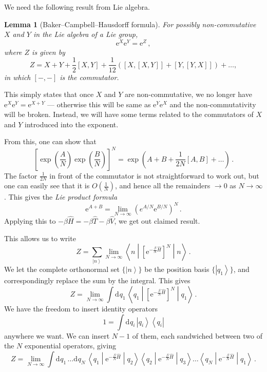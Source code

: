 \documentclass{article}
\theoremstyle{plain}\theoremheaderfont{\normalfont\itshape}\theorembodyfont{\rmfamily}\theoremseparator{.}\newtheorem*{rem}{Remark}\newtheorem*{ex}{Example}\newtheorem*{proof}{Proof}\newtheorem*{altp}{Alternative proof}
\theoremstyle{plain}\theoremheaderfont{\normalfont\bfseries}\theorembodyfont{\rmfamily}\theoremseparator{.}\newtheorem{thm}{Theorem}[section]\newtheorem{lem}[thm]{Lemma}\newtheorem{prop}[thm]{Proposition}\newtheorem*{cor}{Corollary}\newtheorem{defn}[thm]{Definition}\newtheorem{clm}[thm]{Claim}\newtheorem{clminproof}{Claim}
\theoremstyle{break}\theoremheaderfont{\normalfont\itshape}\theorembodyfont{\rmfamily}\theoremseparator{.\medskip}\newtheorem*{proofskip}{Proof}\newtheorem*{exs}{Examples}\newtheorem*{rems}{Remarks}
\theoremstyle{break}\theoremheaderfont{\normalfont\bfseries}\theorembodyfont{\rmfamily}\theoremseparator{.\medskip}\newtheorem{lemskip}[thm]{Lemma}\newtheorem{defnskip}[thm]{Definition}\newtheorem{propskip}[thm]{Proposition}\newtheorem{thmskip}[thm]{Theorem}
\numberwithin{equation}{section}
\newcommand{\ee}{\mathrm{e}}
\newcommand{\dd}[2][]{\mathrm{d}^{#1} #2\,}
\newcommand{\bra}[1]{\left\langle #1 \right|}
\newcommand{\ket}[1]{\left| #1 \right\rangle}
\newcommand{\mel}[3]{\left\langle #1 \middle| #2 \middle| #3 \right\rangle}
\newcommand{\expval}[2]{\left\langle #2 \middle| #1 \middle| #2 \right\rangle}
\begin{document}
    We need the following result from Lie algebra.
    \begin{lem}[Baker--Campbell--Hausdorff formula]
        For possibly non-commutative \(X\) and \(Y\) in the Lie algebra of a Lie group,
        \begin{equation}
            \ee^{X}\ee^{Y}=\ee^{Z}\,,
        \end{equation}
        where \(Z\) is given by
        \begin{equation}
            Z=X+Y+\frac{1}{2}[X,Y]+\frac{1}{12}([X,[X,Y]]+[Y,[Y,X]])+\dots,
        \end{equation}
        in which \([-,-]\) is the commutator.
    \end{lem}
    This simply states that once \(X\) and \(Y\) are non-commutative, we no longer have \(\ee^{X}\ee^{Y}=\ee^{X+Y}\) --- otherwise this will be same as \(\ee^{Y}\ee^{X}\) and the non-commutativity will be broken. Instead, we will have some terms related to the commutators of \(X\) and \(Y\) introduced into the exponent.
    
    From this, one can show that
    \begin{equation}
        \left[\exp\left(\frac{A}{N}\right)\exp\left(\frac{B}{N}\right)\right]^N = \exp\left(A+B+\frac{1}{2N}[A,B]+\dots\right)\,.
    \end{equation}
    The factor \(\frac{1}{2N}\) in front of the commutator is not straightforward to work out, but one can easily see that it is \(O(\frac{1}{N})\), and hence all the remainders \(\to 0\) as \(N\to\infty\). This gives the \textit{Lie product formula}
    \begin{equation}
        \ee^{A+B}=\lim_{N\to\infty}\left(e^{A/N}\ee^{B/N}\right)^N\,.
    \end{equation}
    Applying this to \(-\beta\hat{H}=-\beta\hat{T}-\beta\hat{V}\), we get out claimed result.

    This allows us to write
    \begin{equation}
        Z=\sum_{\ket{n}}\lim_{N\to\infty}\expval{\left[\ee^{-\frac{\beta}{N}\hat{H}}\right]^N}{n}\,.
    \end{equation}
    We let the complete orthonormal set \(\{\ket{n}\}\) be the position basis \(\{\ket{q_1}\}\), and correspondingly replace the sum by the integral. This gives
    \begin{equation}
        Z=\lim_{N\to\infty}\int\dd{q_1}\expval{\left[\ee^{-\frac{\beta}{N}\hat{H}}\right]^N}{q_1}\,.
    \end{equation}
    We have the freedom to insert identity operators
    \begin{equation}
        1=\int\dd{q_i}\ket{q_i}\bra{q_i}
    \end{equation}
    anywhere we want. We can insert \(N-1\) of them, each sandwiched between two of the \(N\) exponential operators, giving
    \begin{equation}
        Z=\lim_{N\to\infty}\int\dd{q_1}\dots\dd{q_N}\mel{q_1}{\ee^{-\frac{\beta}{N}\hat{H}}}{q_2}\mel{q_2}{\ee^{-\frac{\beta}{N}\hat{H}}}{q_3}\dots\mel{q_N}{\ee^{-\frac{\beta}{N}\hat{H}}}{q_1}\,.
    \end{equation}
\end{document}
